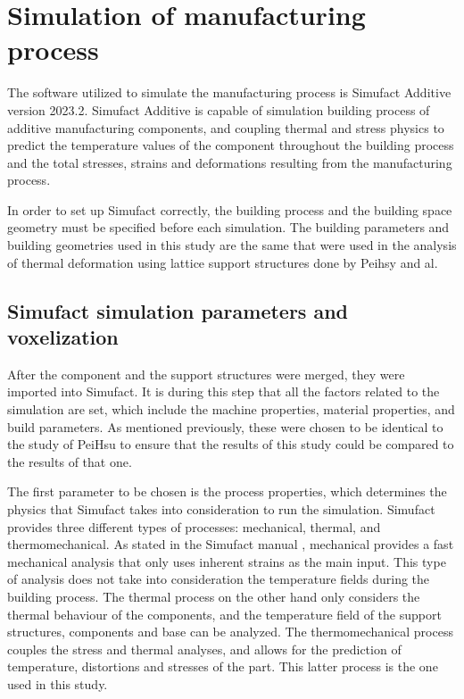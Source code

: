 \documentclass[../main.tex]{subfiles}
\begin{document}


\section{Simulation of manufacturing process}


The software utilized to simulate the manufacturing process is Simufact Additive version 2023.2. Simufact Additive is capable of simulation building process of additive manufacturing components, and coupling thermal and stress physics to predict the temperature values of the component throughout the building process and the total stresses, strains and deformations resulting from the manufacturing process. 

In order to set up Simufact correctly, the building process and the building space geometry must be specified before each simulation. The building parameters and building geometries used in this study are the same that were used in the analysis of thermal deformation using lattice support structures done by Peihsy and al. 

\subsection{Simufact simulation parameters and voxelization}


After the component and the support structures were merged, they were imported into Simufact. It is during this step that all the factors related to the simulation are set, which include the machine properties, material properties, and build parameters. As mentioned previously, these were chosen to be identical to the study of PeiHsu to ensure that the results of this study could be compared to the results of that one. 

The first parameter to be chosen is the process properties, which determines the physics that Simufact takes into consideration to run the simulation. Simufact provides three different types of processes: mechanical, thermal, and thermomechanical. As stated in the Simufact manual , mechanical provides a fast mechanical analysis that only uses inherent strains as the main input. This type of analysis does not take into consideration the temperature fields during the building process. The thermal process on the other hand only considers the thermal behaviour of the components, and the temperature field of the support structures, components and base can be analyzed. The thermomechanical process couples the stress and thermal analyses, and allows for the prediction of temperature, distortions and stresses of the part. This latter process is the one used in this study.
\end{document}

